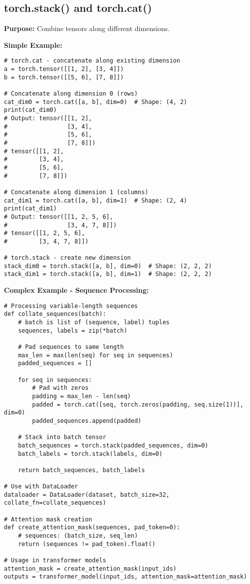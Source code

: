\documentclass[11pt,a4paper]{book}
\begin{document}
\subsection{torch.stack() and torch.cat()}

\textbf{Purpose:} Combine tensors along different dimensions.

\textbf{Simple Example:}
\begin{verbatim}
# torch.cat - concatenate along existing dimension
a = torch.tensor([[1, 2], [3, 4]])
b = torch.tensor([[5, 6], [7, 8]])

# Concatenate along dimension 0 (rows)
cat_dim0 = torch.cat([a, b], dim=0)  # Shape: (4, 2)
print(cat_dim0)
# Output: tensor([[1, 2],
#                 [3, 4],
#                 [5, 6],
#                 [7, 8]])
# tensor([[1, 2],
#         [3, 4],
#         [5, 6],
#         [7, 8]])

# Concatenate along dimension 1 (columns)
cat_dim1 = torch.cat([a, b], dim=1)  # Shape: (2, 4)
print(cat_dim1)
# Output: tensor([[1, 2, 5, 6],
#                 [3, 4, 7, 8]])
# tensor([[1, 2, 5, 6],
#         [3, 4, 7, 8]])

# torch.stack - create new dimension
stack_dim0 = torch.stack([a, b], dim=0)  # Shape: (2, 2, 2)
stack_dim1 = torch.stack([a, b], dim=1)  # Shape: (2, 2, 2)
\end{verbatim}

\textbf{Complex Example - Sequence Processing:}
\begin{verbatim}
# Processing variable-length sequences
def collate_sequences(batch):
    # batch is list of (sequence, label) tuples
    sequences, labels = zip(*batch)
    
    # Pad sequences to same length
    max_len = max(len(seq) for seq in sequences)
    padded_sequences = []
    
    for seq in sequences:
        # Pad with zeros
        padding = max_len - len(seq)
        padded = torch.cat([seq, torch.zeros(padding, seq.size(1))], dim=0)
        padded_sequences.append(padded)
    
    # Stack into batch tensor
    batch_sequences = torch.stack(padded_sequences, dim=0)
    batch_labels = torch.stack(labels, dim=0)
    
    return batch_sequences, batch_labels

# Use with DataLoader
dataloader = DataLoader(dataset, batch_size=32, collate_fn=collate_sequences)

# Attention mask creation
def create_attention_mask(sequences, pad_token=0):
    # sequences: (batch_size, seq_len)
    return (sequences != pad_token).float()

# Usage in transformer models
attention_mask = create_attention_mask(input_ids)
outputs = transformer_model(input_ids, attention_mask=attention_mask)
\end{verbatim}
\end{document}

